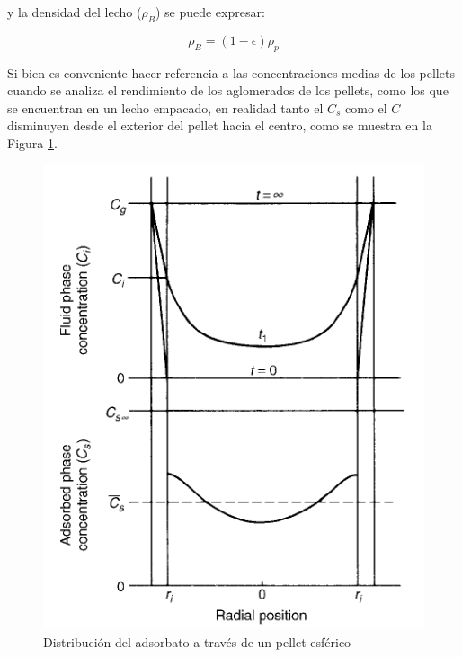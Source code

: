 \documentclass[11pt]{book}
\begin{document}
y la densidad del lecho ($\rho_B$) se puede expresar:

\begin{equation*}
    \rho_B = (1-\epsilon) \rho_p
\end{equation*}

Si bien es conveniente hacer referencia a las concentraciones medias de los pellets cuando se analiza el rendimiento de los aglomerados de los pellets, como los que se encuentran en un lecho empacado, en realidad tanto el $C_s$ como el $C$ disminuyen desde el exterior del pellet hacia el centro, como se muestra en la Figura \ref{fig:Distribucion_Adsorbato_1}.

\begin{figure}[H]
    \centering
    \includegraphics{img/adsorcion/DistribucionAdsorcion_1.PNG}
    \caption{Distribución del adsorbato a través de un pellet esférico}
    \label{fig:Distribucion_Adsorbato_1}
\end{figure}
\end{document}
